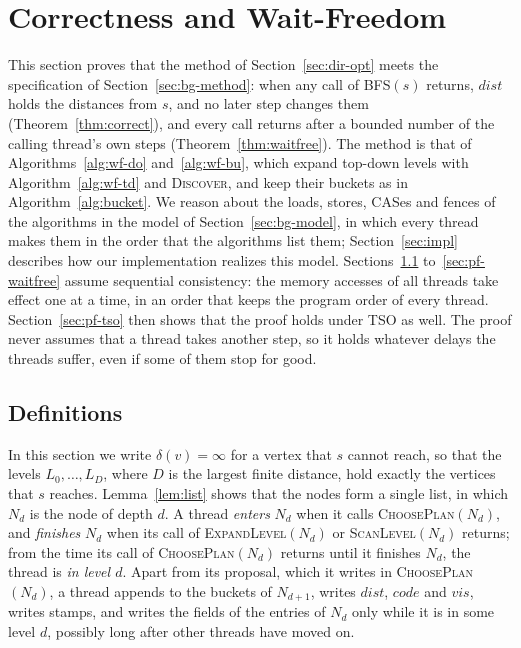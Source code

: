 \section{Correctness and Wait-Freedom}
\label{sec:proof}

This section proves that the method of Section~\ref{sec:dir-opt} meets the specification of Section~\ref{sec:bg-method}: when any call of \textsc{BFS}$(s)$ returns, $\mathit{dist}$ holds the distances from $s$, and no later step changes them (Theorem~\ref{thm:correct}), and every call returns after a bounded number of the calling thread's own steps (Theorem~\ref{thm:waitfree}). The method is that of Algorithms~\ref{alg:wf-do} and~\ref{alg:wf-bu}, which expand top-down levels with Algorithm~\ref{alg:wf-td} and \textsc{Discover}, and keep their buckets as in Algorithm~\ref{alg:bucket}. We reason about the loads, stores, CASes and fences of the algorithms in the model of Section~\ref{sec:bg-model}, in which every thread makes them in the order that the algorithms list them; Section~\ref{sec:impl} describes how our implementation realizes this model. Sections~\ref{sec:pf-defs} to~\ref{sec:pf-waitfree} assume sequential consistency: the memory accesses of all threads take effect one at a time, in an order that keeps the program order of every thread. Section~\ref{sec:pf-tso} then shows that the proof holds under TSO as well. The proof never assumes that a thread takes another step, so it holds whatever delays the threads suffer, even if some of them stop for good.

\subsection{Definitions}
\label{sec:pf-defs}

In this section we write $\delta(v) = \infty$ for a vertex that $s$ cannot reach, so that the levels $L_0, \ldots, L_D$, where $D$ is the largest finite distance, hold exactly the vertices that $s$ reaches. Lemma~\ref{lem:list} shows that the nodes form a single list, in which $N_d$ is the node of depth $d$. A thread \emph{enters} $N_d$ when it calls \textsc{ChoosePlan}$(N_d)$, and \emph{finishes} $N_d$ when its call of \textsc{ExpandLevel}$(N_d)$ or \textsc{ScanLevel}$(N_d)$ returns; from the time its call of \textsc{ChoosePlan}$(N_d)$ returns until it finishes $N_d$, the thread is \emph{in level $d$}. Apart from its proposal, which it writes in \textsc{ChoosePlan}$(N_d)$, a thread appends to the buckets of $N_{d+1}$, writes $\mathit{dist}$, $\mathit{code}$ and $\mathit{vis}$, writes stamps, and writes the fields of the entries of $N_d$ only while it is in some level $d$, possibly long after other threads have moved on.

